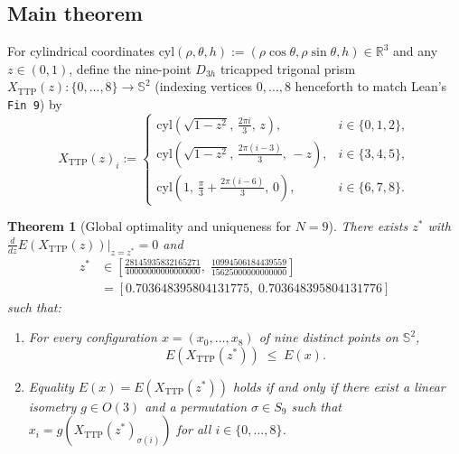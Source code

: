 \documentclass[11pt,reqno]{amsart}
\renewcommand{\_}{\origunderscore\allowbreak}
\newtheorem{theorem}{Theorem}[section]
\theoremstyle{definition}
\newcommand{\R}{\mathbb{R}}
\newcommand{\Sph}{\mathbb{S}^2}
\newcommand{\TTP}{X_{\mathrm{TTP}}}
\begin{document}
\subsection{Main theorem}\label{subsec:main-thm}
For cylindrical coordinates $\mathrm{cyl}(\rho,\theta,h) := (\rho\cos\theta, \rho\sin\theta, h) \in \R^3$ and any $z \in (0,1)$, define the nine-point $D_{3h}$ tricapped trigonal prism $\TTP(z) : \{0,\dots,8\} \to \Sph$ (indexing vertices $0,\dots,8$ henceforth to match Lean's \texttt{Fin 9}) by
\begin{equation}\label{eq:ttp-def}
  \TTP(z)_i := \begin{cases}
    \mathrm{cyl}\!\left(\sqrt{1-z^2},\, \frac{2\pi i}{3},\, z\right), & i \in \{0,1,2\}, \\[4pt]
    \mathrm{cyl}\!\left(\sqrt{1-z^2},\, \frac{2\pi(i-3)}{3},\, -z\right), & i \in \{3,4,5\}, \\[4pt]
    \mathrm{cyl}\!\left(1,\, \frac{\pi}{3} + \frac{2\pi(i-6)}{3},\, 0\right), & i \in \{6,7,8\}.
  \end{cases}
\end{equation}

\begin{theorem}[Global optimality and uniqueness for $N=9$]\label{thm:main}
There exists $z^*$ with $\frac{d}{dz}E(\TTP(z))\big|_{z=z^*} = 0$ and
\begin{equation}\label{eq:zstar-interval}
  \begin{aligned}
  z^* &\in \left[\frac{28145935832165271}{40000000000000000},\; \frac{10994506184439559}{15625000000000000}\right] \\
      &= [0.703648395804131775,\; 0.703648395804131776]
  \end{aligned}
\end{equation}
such that:
\begin{enumerate}[label=\textup{(\roman*)},leftmargin=2.2em]
  \item For every configuration $x = (x_0,\dots,x_8)$ of nine distinct points on $\Sph$,
  \[
    E(\TTP(z^*)) \;\le\; E(x).
  \]
  \item Equality $E(x) = E(\TTP(z^*))$ holds if and only if there exist a linear isometry $g \in O(3)$ and a permutation $\sigma \in S_9$ such that $x_i = g(\TTP(z^*)_{\sigma(i)})$ for all $i \in \{0,\dots,8\}$.
\end{enumerate}
\end{theorem}
\end{document}
